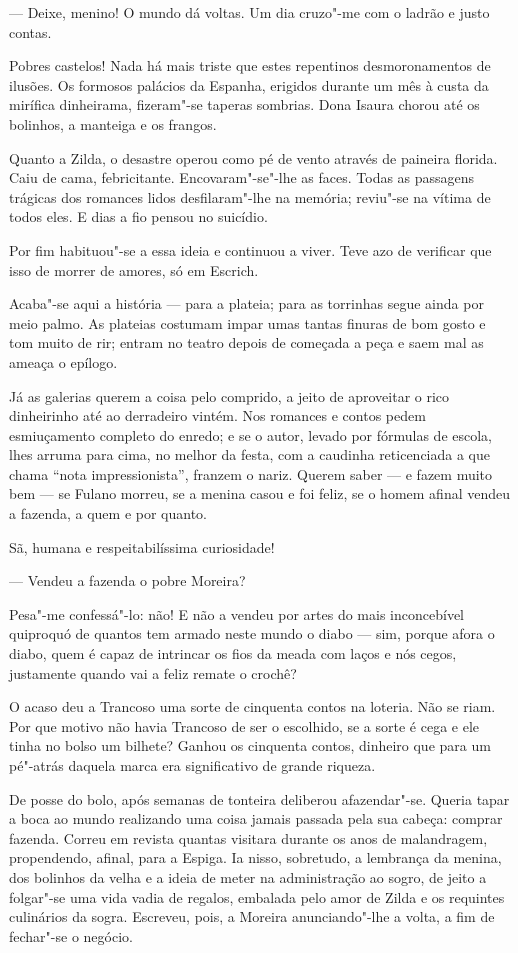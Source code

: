 --- Deixe, menino! O mundo dá voltas. Um dia cruzo"-me com o ladrão e
justo contas.

Pobres castelos! Nada há mais triste que estes repentinos
desmoronamentos de ilusões. Os formosos palácios da Espanha, erigidos
durante um mês à custa da mirífica dinheirama, fizeram"-se taperas
sombrias. Dona Isaura chorou até os bolinhos, a manteiga e os frangos.

Quanto a Zilda, o desastre operou como pé de vento através de paineira
florida. Caiu de cama, febricitante. Encovaram"-se"-lhe as faces. Todas as
passagens trágicas dos romances lidos desfilaram"-lhe na memória;
reviu"-se na vítima de todos eles. E dias a fio pensou no suicídio.

Por fim habituou"-se a essa ideia e continuou a viver. Teve azo de
verificar que isso de morrer de amores, só em Escrich.

Acaba"-se aqui a história --- para a plateia; para as torrinhas segue
ainda por meio palmo. As plateias costumam impar umas tantas finuras de
bom gosto e tom muito de rir; entram no teatro depois de começada a peça
e saem mal as ameaça o epílogo.

Já as galerias querem a coisa pelo comprido, a jeito de aproveitar o
rico dinheirinho até ao derradeiro vintém. Nos romances e contos pedem
esmiuçamento completo do enredo; e se o autor, levado por fórmulas de
escola, lhes arruma para cima, no melhor da festa, com a caudinha
reticenciada a que chama ``nota impressionista'', franzem o nariz.
Querem saber --- e fazem muito bem --- se Fulano morreu, se a menina
casou e foi feliz, se o homem afinal vendeu a fazenda, a quem e por
quanto.

Sã, humana e respeitabilíssima curiosidade!

--- Vendeu a fazenda o pobre Moreira?

Pesa"-me confessá"-lo: não! E não a vendeu por artes do mais inconcebível
quiproquó de quantos tem armado neste mundo o diabo --- sim, porque
afora o diabo, quem é capaz de intrincar os fios da meada com laços e
nós cegos, justamente quando vai a feliz remate o crochê?

O acaso deu a Trancoso uma sorte de cinquenta contos na loteria. Não se
riam. Por que motivo não havia Trancoso de ser o escolhido, se a sorte é
cega e ele tinha no bolso um bilhete? Ganhou os cinquenta contos,
dinheiro que para um pé"-atrás daquela marca era significativo de grande
riqueza.

De posse do bolo, após semanas de tonteira deliberou afazendar"-se.
Queria tapar a boca ao mundo realizando uma coisa jamais passada pela
sua cabeça: comprar fazenda. Correu em revista quantas visitara durante
os anos de malandragem, propendendo, afinal, para a Espiga. Ia nisso,
sobretudo, a lembrança da menina, dos bolinhos da velha e a ideia de
meter na administração ao sogro, de jeito a folgar"-se uma vida vadia de
regalos, embalada pelo amor de Zilda e os requintes culinários da sogra.
Escreveu, pois, a Moreira anunciando"-lhe a volta, a fim de fechar"-se o
negócio.

